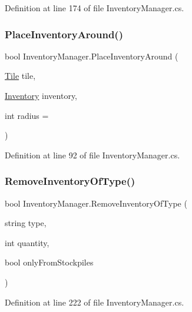 Definition at line 174 of file Inventory\+Manager.\+cs.

\mbox{\label{class_inventory_manager_ab743fa49734d3219b58bb119ba2bd50b}} 
\subsubsection{\texorpdfstring{Place\+Inventory\+Around()}{PlaceInventoryAround()}}
{\footnotesize\ttfamily bool Inventory\+Manager.\+Place\+Inventory\+Around (\begin{DoxyParamCaption}\item[{\hyperlink{class_tile}{Tile}}]{tile,  }\item[{\hyperlink{class_inventory}{Inventory}}]{inventory,  }\item[{int}]{radius = {} }\end{DoxyParamCaption})}



Definition at line 92 of file Inventory\+Manager.\+cs.

\mbox{\label{class_inventory_manager_a182cd5c48f9c02fc6e861e7d7d9253b4}} 
\subsubsection{\texorpdfstring{Remove\+Inventory\+Of\+Type()}{RemoveInventoryOfType()}}
{\footnotesize\ttfamily bool Inventory\+Manager.\+Remove\+Inventory\+Of\+Type (\begin{DoxyParamCaption}\item[{string}]{type,  }\item[{int}]{quantity,  }\item[{bool}]{only\+From\+Stockpiles }\end{DoxyParamCaption})}



Definition at line 222 of file Inventory\+Manager.\+cs.

\mbox{\label{class_inventory_manager_af9628c4fb140e7d64c3b423e09cfd20b}} 
